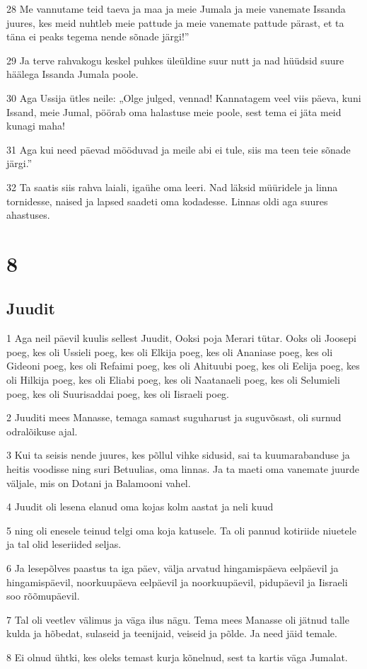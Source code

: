 \par 28 Me vannutame teid taeva ja maa ja meie Jumala ja meie vanemate Issanda juures, kes meid nuhtleb meie pattude ja meie vanemate pattude pärast, et ta täna ei peaks tegema nende sõnade järgi!”
\par 29 Ja terve rahvakogu keskel puhkes üleüldine suur nutt ja nad hüüdsid suure häälega Issanda Jumala poole.
\par 30 Aga Ussija ütles neile: „Olge julged, vennad! Kannatagem veel viis päeva, kuni Issand, meie Jumal, pöörab oma halastuse meie poole, sest tema ei jäta meid kunagi maha!
\par 31 Aga kui need päevad mööduvad ja meile abi ei tule, siis ma teen teie sõnade järgi.”
\par 32 Ta saatis siis rahva laiali, igaühe oma leeri. Nad läksid müüridele ja linna tornidesse, naised ja lapsed saadeti oma kodadesse. Linnas oldi aga suures ahastuses.


\chapter{8}

\section*{Juudit}

\par 1 Aga neil päevil kuulis sellest Juudit, Ooksi poja Merari tütar. Ooks oli Joosepi poeg, kes oli Ussieli poeg, kes oli Elkija poeg, kes oli Ananiase poeg, kes oli Gideoni poeg, kes oli Refaimi poeg, kes oli Ahituubi poeg, kes oli Eelija poeg, kes oli Hilkija poeg, kes oli Eliabi poeg, kes oli Naatanaeli poeg, kes oli Selumieli poeg, kes oli Suurisaddai poeg, kes oli Iisraeli poeg.
\par 2 Juuditi mees Manasse, temaga samast suguharust ja suguvõsast, oli surnud odralõikuse ajal.
\par 3 Kui ta seisis nende juures, kes põllul vihke sidusid, sai ta kuumarabanduse ja heitis voodisse ning suri Betuulias, oma linnas. Ja ta maeti oma vanemate juurde väljale, mis on Dotani ja Balamooni vahel.
\par 4 Juudit oli lesena elanud oma kojas kolm aastat ja neli kuud
\par 5 ning oli enesele teinud telgi oma koja katusele. Ta oli pannud kotiriide niuetele ja tal olid leseriided seljas.
\par 6 Ja lesepõlves paastus ta iga päev, välja arvatud hingamispäeva eelpäevil ja hingamispäevil, noorkuupäeva eelpäevil ja noorkuupäevil, pidupäevil ja Iisraeli soo rõõmupäevil.
\par 7 Tal oli veetlev välimus ja väga ilus nägu. Tema mees Manasse oli jätnud talle kulda ja hõbedat, sulaseid ja teenijaid, veiseid ja põlde. Ja need jäid temale.
\par 8 Ei olnud ühtki, kes oleks temast kurja kõnelnud, sest ta kartis väga Jumalat.

